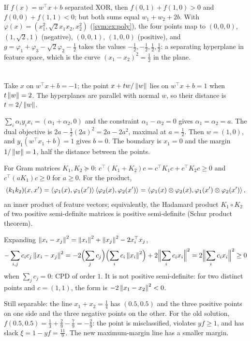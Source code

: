 If $f(x) = w^\top x + b$ separated XOR, then $f(0, 1) + f(1, 0)>0$ and $f(0, 0) + f(1, 1)<0$; but both sums equal
$w_1 + w_2 + 2b$. With $\varphi(x) = (x_1^2, \sqrt2x_1x_2, x_2^2)$ (\cref{svm:ex:poly}), the four points map to $(0, 0, 0)$,
$(1, \sqrt2, 1)$ (negative), $(0, 0, 1)$, $(1, 0, 0)$ (positive), and $g = \varphi_1 + \varphi_3 - \sqrt2\varphi_2 - \frac12$ takes the values
$-\frac12, -\frac12, \frac12, \frac12$: a separating hyperplane in feature space, which is the curve
$(x_1 - x_2)^2 = \frac12$ in the plane.

\section{}

Take $x$ on $w^\top x + b = -1$; the point $x + tw/\left\|w\right\|$ lies on $w^\top x + b = 1$ when $t\left\|w\right\| = 2$. The hyperplanes are
parallel with normal $w$, so their distance is $t = 2/\left\|w\right\|$.

$\sum_i\alpha_iy_ix_i = (\alpha_1 + \alpha_2, 0)$ and the constraint $\alpha_1 - \alpha_2 = 0$ gives $\alpha_1 = \alpha_2 = a$. The dual objective is
$2a - \frac12(2a)^2 = 2a - 2a^2$, maximal at $a = \frac12$. Then $w = (1, 0)$, and $y_1(w^\top x_1 + b) = 1$ gives $b = 0$. The
boundary is $x_1 = 0$ and the margin $1/\left\|w\right\| = 1$, half the distance between the points.

For Gram matrices $K_1, K_2\succeq0$: $c^\top(K_1 + K_2)c = c^\top K_1c + c^\top K_2c\geq0$ and $c^\top(aK_1)c\geq0$ for $a\geq0$. For the
product,
\[
  (k_1k_2)(x, x') = \left\langle \varphi_1(x), \varphi_1(x') \right\rangle\left\langle \varphi_2(x), \varphi_2(x') \right\rangle = \left\langle \varphi_1(x)\otimes\varphi_2(x), \varphi_1(x')\otimes\varphi_2(x') \right\rangle,
\]
an inner product of feature vectors; equivalently, the Hadamard product $K_1\circ K_2$ of two positive
semi-definite matrices is positive semi-definite (Schur product theorem).

Expanding $\left\|x_i - x_j\right\|^2 = \left\|x_i\right\|^2 + \left\|x_j\right\|^2 - 2x_i^\top x_j$,
\[
  -\sum_{i,j}c_ic_j\left\|x_i - x_j\right\|^2 = -2\Bigl(\sum_jc_j\Bigr)\Bigl(\sum_ic_i\left\|x_i\right\|^2\Bigr) + 2\Bigl\Vert\sum_ic_ix_i\Bigr\Vert^2 = 2\Bigl\Vert\sum_ic_ix_i\Bigr\Vert^2\geq0
\]
when $\sum_jc_j = 0$: CPD of order $1$. It is not positive semi-definite: for two distinct points and
$c = (1, 1)$, the form is $-2\left\|x_1 - x_2\right\|^2<0$.

Still separable: the line $x_1 + x_2 = \frac14$ has $(0.5, 0.5)$ and the three positive points on one side and
the three negative points on the other. For the old solution,
$f(0.5, 0.5) = \frac13 + \frac29 - \frac79 = -\frac29$: the point is misclassified, violates $yf\geq1$, and has slack
$\xi = 1 - yf = \frac{11}9$. The new maximum-margin line has a smaller margin.

